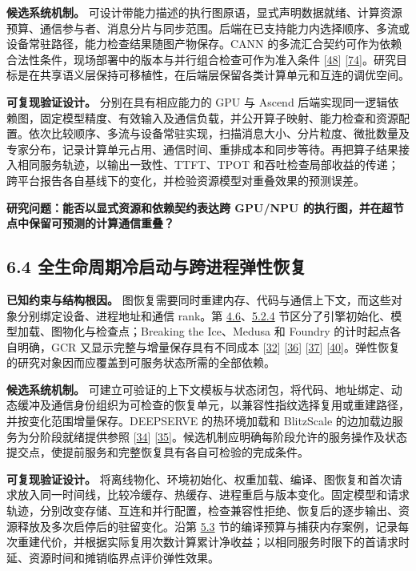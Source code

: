 \documentclass[UTF8,10.5pt,fontset=windows]{ctexart}
\begin{document}
\textbf{候选系统机制。}
可设计带能力描述的执行图原语，显式声明数据就绪、计算资源预算、通信参与者、消息分片与同步范围。后端在已支持能力内选择顺序、多流或设备常驻路径，能力检查结果随图产物保存。CANN
的多流汇合契约可作为依赖合法性条件，现场部署中的版本与并行组合检查可作为准入条件
{[}\protect\hyperlink{ref-cann910multi}{48}{]}
{[}\protect\hyperlink{ref-yu2026ascendfield}{74}{]}。研究目标是在共享语义层保持可移植性，在后端层保留各类计算单元和互连的调优空间。

\textbf{可复现验证设计。} 分别在具有相应能力的 GPU 与 Ascend
后端实现同一逻辑依赖图，固定模型精度、有效输入及通信负载，并公开算子映射、能力检查和资源配置。依次比较顺序、多流与设备常驻实现，扫描消息大小、分片粒度、微批数量及专家分布，记录计算单元占用、通信时间、重排成本和同步等待。再把算子结果接入相同服务轨迹，以输出一致性、TTFT、TPOT
和吞吐检查局部收益的传递；跨平台报告各自基线下的变化，并检验资源模型对重叠效果的预测误差。

\textbf{研究问题：能否以显式资源和依赖契约表达跨 GPU/NPU
的执行图，并在超节点中保留可预测的计算通信重叠？}

\hypertarget{section-6-4}{%
\subsection{6.4 全生命周期冷启动与跨进程弹性恢复}\label{section-6-4}}

\textbf{已知约束与结构根因。}
图恢复需要同时重建内存、代码与通信上下文，而这些对象分别绑定设备、进程地址和通信
rank。第
\protect\hyperlink{section-4-6}{4.6}、\protect\hyperlink{section-5-2-4}{5.2.4}
节区分了引擎初始化、模型加载、图物化与检查点；Breaking the Ice、Medusa
和 Foundry 的计时起点各自明确，GCR 又显示完整与增量保存具有不同成本
{[}\protect\hyperlink{ref-kabakibo2026breakingice}{32}{]}
{[}\protect\hyperlink{ref-zeng2025medusa}{36}{]}
{[}\protect\hyperlink{ref-liu2026foundry}{37}{]}
{[}\protect\hyperlink{ref-zeng2026gcr}{40}{]}。弹性恢复的研究对象因而应覆盖到可服务状态所需的全部依赖。

\textbf{候选系统机制。}
可建立可验证的上下文模板与状态闭包，将代码、地址绑定、动态缓冲及通信身份组织为可检查的恢复单元，以兼容性指纹选择复用或重建路径，并按变化范围增量保存。DEEPSERVE
的热环境加载和 BlitzScale 的边加载边服务为分阶段就绪提供参照
{[}\protect\hyperlink{ref-hu2025deepserve}{34}{]}
{[}\protect\hyperlink{ref-zhang2025blitzscale}{35}{]}。候选机制应明确每阶段允许的服务操作及状态提交点，使提前服务和完整恢复具有各自可检验的完成条件。

\textbf{可复现验证设计。}
将离线物化、环境初始化、权重加载、编译、图恢复和首次请求放入同一时间线，比较冷缓存、热缓存、进程重启与版本变化。固定模型和请求轨迹，分别改变存储、互连和并行配置，检查兼容性拒绝、恢复后的逐步输出、资源释放及多次启停后的驻留变化。沿第
\protect\hyperlink{section-5-3}{5.3}
节的编译预算与捕获内存案例，记录每次重建代价，并根据实际复用次数计算累计净收益；以相同服务时限下的首请求时延、资源时间和摊销临界点评价弹性效果。
\end{document}
